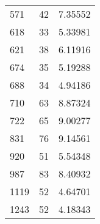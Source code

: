 \begin{longtable}[c]{|l|l|l|}
571    & 42       & 7.35552       \\
618    & 33       & 5.33981       \\
621    & 38       & 6.11916       \\
674    & 35       & 5.19288       \\
688    & 34       & 4.94186       \\
710    & 63       & 8.87324       \\
722    & 65       & 9.00277       \\
831    & 76       & 9.14561       \\
920    & 51       & 5.54348       \\
987    & 83       & 8.40932       \\
1119   & 52       & 4.64701       \\
1243   & 52       & 4.18343       \\
\hline
\end{longtable}